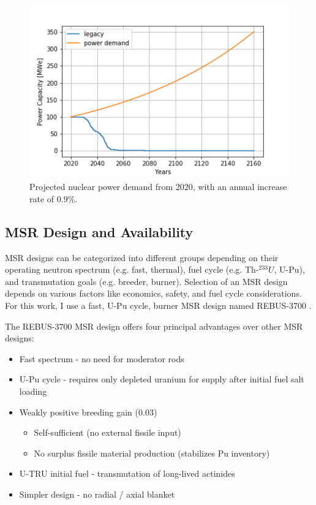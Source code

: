 \begin{figure}[htbp!]
	\begin{center}
		\includegraphics[scale=0.6]{./images/us/projection.png}
	\end{center}
	\caption{Projected nuclear power demand from 2020, with an
			 annual increase rate of 0.9\%.}
	\label{fig:us_proj}
\end{figure}

\subsection{\gls{MSR} Design and Availability}


\gls{MSR} designs can be categorized into
different groups depending on their operating
neutron spectrum (e.g. fast, thermal), fuel cycle (e.g. Th-$^{233}U$, U-Pu),
and transmutation goals (e.g. breeder, burner). Selection of an \gls{MSR}
design depends on various factors like economics, safety, and fuel cycle
considerations. For this work, I use a fast, U-Pu cycle, burner \gls{MSR} design
named REBUS-3700 \cite{mourogov_potentialities_2006}.

The REBUS-3700 \gls{MSR} design offers four principal
advantages over other \gls{MSR} designs:
\begin{itemize}
	\item Fast spectrum - no need for moderator rods 
	\item U-Pu cycle - requires only depleted uranium for supply after initial fuel salt loading
	\item Weakly positive breeding gain (0.03)
	\begin{itemize}
		\item Self-sufficient (no external fissile input)
		\item No surplus fissile material production (stabilizes Pu inventory)
	\end{itemize}
	\item U-\gls{TRU} initial fuel - transmutation of long-lived actinides
	\item Simpler design - no radial / axial blanket
\end{itemize}

